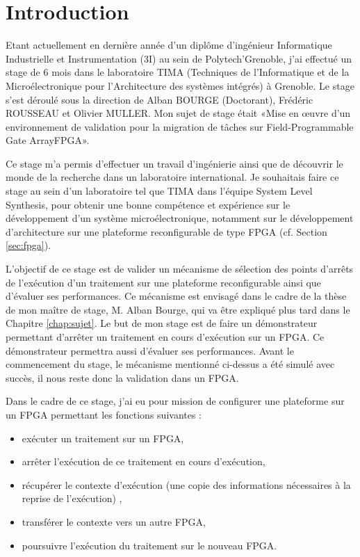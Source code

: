 \chapter{Introduction}
\label{chap:intro}
\OnehalfSpacing
\setlength{\parindent}{2em}
Etant actuellement en dernière année d'un diplôme d'ingénieur Informatique Industrielle et Instrumentation (3I) au sein de Polytech'Grenoble, 
j'ai effectué un stage de 6 mois dans le laboratoire TIMA (Techniques de l'Informatique et de la Microélectronique 
pour l'Architecture des systèmes intégrés) à Grenoble. 
Le stage s'est déroulé sous la direction de Alban BOURGE (Doctorant), Frédéric ROUSSEAU et Olivier MULLER. 
Mon sujet de stage était «Mise en œuvre d'un environnement de validation pour la migration de tâches sur Field-Programmable Gate Array\gls{FPGA}».

Ce stage m'a permis d'effectuer un travail d'ingénierie ainsi que de découvrir le monde de la recherche
dans un laboratoire international. Je souhaitais faire ce stage au sein d'un laboratoire tel que TIMA dans l'équipe System Level Synthesis, pour obtenir une bonne compétence et expérience sur le développement d'un système microélectronique, notamment sur le développement d'architecture sur une plateforme reconfigurable de type FPGA (cf. Section \ref{sec:fpga}). 

L'objectif de ce stage est de valider un mécanisme de sélection des points d'arrêts de l'exécution d'un traitement sur une plateforme reconfigurable ainsi que d'évaluer ses performances. 
Ce mécanisme est envisagé dans le cadre de la thèse de mon maître de stage, M. Alban Bourge, qui va être expliqué plus tard dans le Chapitre \ref{chap:sujet}. 
Le but de mon stage est de faire un démonstrateur permettant d'arrêter un traitement en cours d'exécution sur un FPGA.
Ce démonstrateur permettra aussi d'évaluer ses performances.
Avant le commencement du stage, le mécanisme mentionné ci-dessus a été simulé avec succès, il nous reste donc la validation dans un FPGA. 

Dans le cadre de ce stage, j'ai eu pour mission de configurer une plateforme sur un FPGA permettant les fonctions suivantes :
\begin{itemize}
\item exécuter un traitement sur un FPGA,
\item arrêter l'exécution de ce traitement en cours d'exécution,
\item récupérer le contexte d'exécution (une copie des informations nécessaires à la reprise de l'exécution) ,
\item transférer le contexte vers un autre FPGA,
\item poursuivre l'exécution du traitement sur le nouveau FPGA.
\end{itemize}

